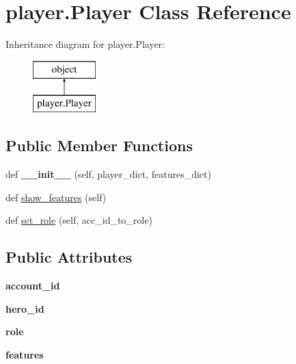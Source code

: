 \hypertarget{classplayer_1_1_player}{}\section{player.\+Player Class Reference}
\label{classplayer_1_1_player}
Inheritance diagram for player.\+Player\+:\begin{figure}[H]
\begin{center}
\leavevmode
\includegraphics[height=2.000000cm]{classplayer_1_1_player}
\end{center}
\end{figure}
\subsection*{Public Member Functions}
\begin{DoxyCompactItemize}
\item 
def {\bfseries \+\_\+\+\_\+init\+\_\+\+\_\+} (self, player\+\_\+dict, features\+\_\+dict)\hypertarget{classplayer_1_1_player_a2415ed4a4b8bf46fa0ac707e54234f71}{}\label{classplayer_1_1_player_a2415ed4a4b8bf46fa0ac707e54234f71}

\item 
def \hyperlink{classplayer_1_1_player_a761d25515133bdc491119aa2e8630ecc}{show\+\_\+features} (self)
\item 
def \hyperlink{classplayer_1_1_player_a3593ddb31b6826c30ce34a1b648609d8}{set\+\_\+role} (self, acc\+\_\+id\+\_\+to\+\_\+role)
\end{DoxyCompactItemize}
\subsection*{Public Attributes}
\begin{DoxyCompactItemize}
\item 
{\bfseries account\+\_\+id}\hypertarget{classplayer_1_1_player_a0ab00a27d2cacb26530bcba6491a2ceb}{}\label{classplayer_1_1_player_a0ab00a27d2cacb26530bcba6491a2ceb}

\item 
{\bfseries hero\+\_\+id}\hypertarget{classplayer_1_1_player_a51f32411dbe933f4c542291294cfae34}{}\label{classplayer_1_1_player_a51f32411dbe933f4c542291294cfae34}

\item 
{\bfseries role}\hypertarget{classplayer_1_1_player_a8bb4462ad80ce41651e9684a7718f598}{}\label{classplayer_1_1_player_a8bb4462ad80ce41651e9684a7718f598}

\item 
{\bfseries features}\hypertarget{classplayer_1_1_player_a439d29a6102a63d9dab0db52616c8c1b}{}\label{classplayer_1_1_player_a439d29a6102a63d9dab0db52616c8c1b}

\end{DoxyCompactItemize}


